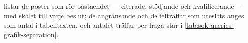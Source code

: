  listar de poster som rör påståendet
--- citerade, stödjande och kvalificerande --- med skälet till varje
beslut; de angränsande och de felträffar som uteslöts anges som antal i
tabelltexten, och antalet träffar per fråga står i
\cref{tab:sok-queries-grafik-separation}.
